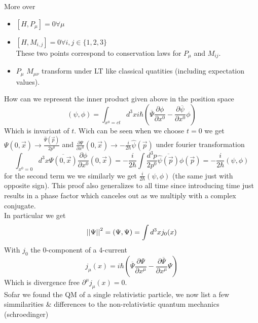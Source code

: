 \documentclass{report}
\begin{document}
More over 
\begin{itemize}
  \item $[H, P_\mu] = 0 \forall \mu$
  \item $[H, M_{i,j}] = 0 \forall i,j \in \{1,2,3\}$\\
    These two points correspond to conservation laws for $P_\mu$ and $M_{ij}$.
  \item $P_\mu$ $M_{\mu \nu}$ transform under LT like classical quatities (including expectation values).
\end{itemize}
How can we represent the inner product given above in the position space \[
  \left( \psi, \phi \right) = \int_{x^0 = ct} d^3x i\hbar \left( \overline{\Psi} \frac{\partial \phi }{\partial x^0 } - \frac{\partial \overline{\psi} }{\partial x^0 } \phi \right) 
\] Which is invariant of $t$. Wich can be seen when we choose $t = 0 $ we get $\Psi\left( 0, \vec{x} \right) \to \frac{\hat{\Psi}\left( \vec{p} \right) }{2 p^0}$ and $\frac{\partial \Psi }{\partial x^0 }\left( 0, \vec{x} \right) \to -\frac{i}{2 \hbar} \hat{\psi}\left( \vec{p} \right) $ under fourier transformation \[
\int_{x^0 = 0} d^3x \overline{\Psi\left( 0, \vec{x} \right) } \frac{\partial \phi }{\partial x^0 }\left( 0, \vec{x} \right) = -\frac{i}{2\hbar} \int \frac{d^3p}{2p^0} \overline{\hat{\psi}\left( \vec{p} \right) } \phi\left( \vec{p} \right) = -\frac{i}{2\hbar} \left( \psi, \phi \right) 
\] for the second term we we similarly we get $\frac{i}{2\hbar} \left( \psi, \phi \right) $ (the same just with opposite sign). This proof also generalizes to all time since introducing time just results in a phase factor which canceles out as we multiply with a complex conjugate.\\
In particular we get \[
  \abs{\abs{\Psi}}^2 = \left( \Psi, \Psi \right) = \int d^3x j_0(x) 
\] With $j_0$ the 0-component of a 4-current \[
j_\mu\left( x \right) = i \hbar\left( \overline{\Psi} \frac{\partial \Psi }{\partial x^\mu } - \frac{\partial \overline{\Psi} }{\partial x^\mu } \Psi \right) 
\] Which is divergence free $\partial^\mu j_\mu\left( x \right)  = 0  $.\\
Sofar we found the QM of a single relativistic particle, we now list a few simmilarities \& differences to the non-relativistic quantum mechanics (schroedinger)
\end{document}
